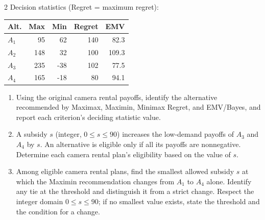 \begin{multicols}{2}
\columnbreak
Decision statistics (Regret = maximum regret):

\vspace{-3mm}
\begin{center}\small\setlength{\tabcolsep}{4pt}
	\begin{tabular}{lrrrr}\toprule
		Alt. & Max & Min & Regret & EMV\\ \midrule
				$A_1$ & 95 & 62 & 140 & 82.3\\
		$A_2$ & 148 & 32 & 100 & 109.3\\
		$A_3$ & 235 & -38 & 102 & 77.5\\
		$A_4$ & 165 & -18 & 80 & 94.1\\
		\bottomrule
	\end{tabular}
\end{center}
\vspace{-3mm}

\begin{enumerate}[label=\textbf{(\alph*)},leftmargin=*]
	\item Using the original camera rental payoffs, identify the alternative recommended by Maximax, Maximin, Minimax Regret, and EMV/Bayes, and report each criterion's deciding statistic value. 

	\item A subsidy $s$ (integer, $0\leq s\leq90$) increases the low-demand payoffs of $A_3$ and $A_4$ by $s$. An alternative is eligible only if all its payoffs are nonnegative. Determine each camera rental plan's eligibility based on the value of $s$. 

	\item Among eligible camera rental plans, find the smallest allowed subsidy $s$ at which the Maximin recommendation changes from $A_1$ to $A_4$ alone. Identify any tie at the threshold and distinguish it from a strict change. Respect the integer domain $0\leq s\leq90$; if no smallest value exists, state the threshold and the condition for a change. 
\end{enumerate}


\end{multicols}
\newpage
